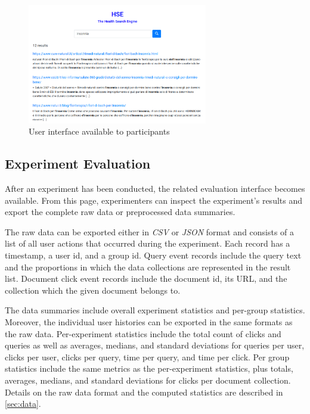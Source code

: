 \documentclass[a4paper]{usiinfbachelorproject}
\begin{document}
\begin{figure} [h]
\centering
\includegraphics[width=0.7\textwidth]{figures/searchUi}
\caption{User interface available to participants}
\label{fig:searchUi}
\end{figure}

\subsection{\textbf{Experiment Evaluation}} \label{sec:designExpEval}

After an experiment has been conducted, the  related evaluation interface becomes available. From this page,
experimenters can inspect the experiment's results and export  the complete raw data
or preprocessed data summaries.

The raw data can be exported either in \emph{CSV} or \emph{JSON} format and consists of a list of all user actions that occurred during the experiment. 
Each record has a timestamp, a user id, and a group id. Query event records include the query text and the proportions in which
the data collections are represented  in the result list. Document click event records include the document id, its URL, and
the collection which the given document belongs to.

The data summaries include overall experiment statistics and per-group statistics. Moreover, the individual user histories can be 
exported in the same formats as the raw data.
Per-experiment statistics include the total count of clicks and queries as well as averages, medians, and standard deviations
for queries per user, clicks per user, clicks per query, time per query, and time per click.
Per group statistics include the same metrics as the per-experiment statistics, plus totals, averages, medians, and standard deviations
for clicks per document collection. Details on the raw data format and the computed statistics are described in \ref{sec:data}.
\end{document}
